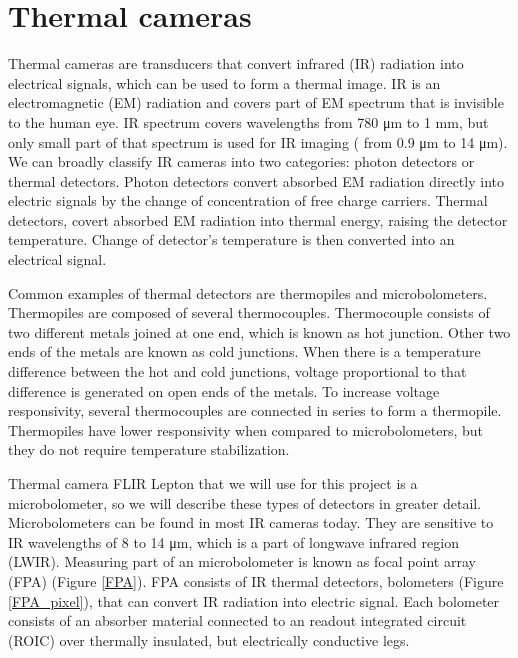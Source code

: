 \section{Thermal cameras}

Thermal cameras are transducers that convert infrared (IR) radiation into electrical signals, which can be used to form a thermal image.
IR is an electromagnetic (EM) radiation and covers part of EM spectrum that is invisible to the human eye.
IR spectrum covers wavelengths from 780 \si{\micro\meter} to 1 \si{\milli\meter}, but only small part of that spectrum is used for IR imaging ( from 0.9 \si{\micro\meter} to 14 \si{\micro\meter})\cite{thermal_book}.
We can broadly classify IR cameras into two categories: photon detectors or thermal detectors\cite{thermal_book}.
Photon detectors convert absorbed EM radiation directly into electric signals by the change of concentration of free charge carriers\cite{thermal_book}.
Thermal detectors, covert absorbed EM radiation into thermal energy, raising the detector temperature\cite{thermal_book}. 
Change of detector's temperature is then converted into an electrical signal.

Common examples of thermal detectors are thermopiles and microbolometers. 
Thermopiles are composed of several thermocouples.
Thermocouple consists of two different metals joined at one end, which is known as hot junction.
Other two ends of the metals are known as cold junctions.
When there is a temperature difference between the hot and cold junctions, voltage proportional to that difference is generated on open ends of the metals.
To increase voltage responsivity, several thermocouples are connected in series to form a thermopile\cite{thermal_book}.
Thermopiles have lower responsivity when compared to microbolometers, but they do not require temperature stabilization\cite{thermal_book}.

Thermal camera FLIR Lepton that we will use for this project is a microbolometer, so we will describe these types of detectors in greater detail.
Microbolometers can be found in most IR cameras today\cite{thermal_book}. 
They are sensitive to IR wavelengths of 8 to 14 \si{\micro\meter}, which is a part of longwave infrared region (LWIR)\cite{thermal_book}.
Measuring part of an microbolometer is known as focal point array (FPA) (Figure \ref{FPA}).
FPA consists of IR thermal detectors, bolometers (Figure \ref{FPA_pixel}), that can convert IR radiation into electric signal.
Each bolometer consists of an absorber material connected to an readout integrated circuit (ROIC) over thermally insulated, but electrically conductive legs\cite{thermal_article}.

